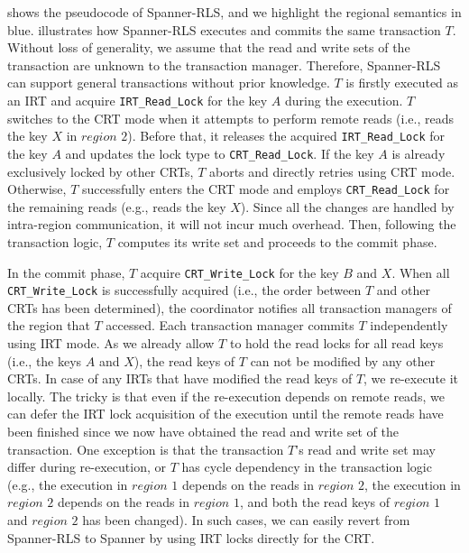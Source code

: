  shows the pseudocode of Spanner-RLS, and we highlight the regional semantics in blue.  illustrates how Spanner-RLS executes and commits the same transaction $T$. Without loss of generality, we assume that the read and write sets of the transaction are unknown to the transaction manager. Therefore, Spanner-RLS can support general transactions without prior knowledge. $T$ is firstly executed as an IRT and acquire \texttt{IRT\_Read\_Lock} for the key $A$ during the execution. $T$ switches to the CRT mode when it attempts to perform remote reads (i.e., reads the key $X$ in $region$ $2$). Before that, it releases the acquired \texttt{IRT\_Read\_Lock} for the key $A$  and updates the lock type to \texttt{CRT\_Read\_Lock}. If the key $A$ is already exclusively locked by other CRTs, $T$ aborts and directly retries using CRT mode. Otherwise, $T$ successfully enters the CRT mode and employs \texttt{CRT\_Read\_Lock} for the remaining reads (e.g., reads the key $X$).
Since all the changes are handled by intra-region communication, it will not incur much overhead. Then, following the transaction logic, $T$ computes its write set and proceeds to the commit phase. 



In the commit phase, $T$ acquire \texttt{CRT\_Write\_Lock} for the key $B$ and $X$. When all \texttt{CRT\_Write\_Lock} is successfully acquired (i.e., the order between $T$ and other CRTs has been determined), the coordinator notifies all transaction managers of the region that $T$ accessed. Each transaction manager commits $T$ independently using IRT mode. As we already allow $T$ to hold the read locks for all read keys (i.e., the keys $A$ and $X$), the read keys of $T$ can not be modified by any other CRTs. In case of any IRTs that have modified the read keys of $T$, we re-execute it locally. The tricky is that even if the re-execution depends on remote reads, we can defer the IRT lock acquisition of the execution until the remote reads have been finished since we now have obtained the read and write set of the transaction. One exception is that the transaction $T$'s read and write set may differ during re-execution, or $T$ has cycle dependency in the transaction logic (e.g., the execution in $region$ $1$ depends on the reads in $region$ $2$, the execution in $region$ $2$ depends on the reads in $region$ $1$, and both the read keys of $region$ $1$ and $region$ $2$ has been changed). In such cases, we can easily revert from Spanner-RLS to Spanner by using IRT locks directly for the CRT.

